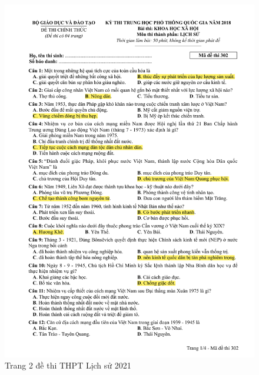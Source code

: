 \begin{figure}[htbp]
    \centering
    \includegraphics[width=1\textwidth, page=2]{Appendix/Fig/2018_302.pdf}
    \caption{Trang 2 đề thi THPT Lịch sử 2021}
\end{figure}

